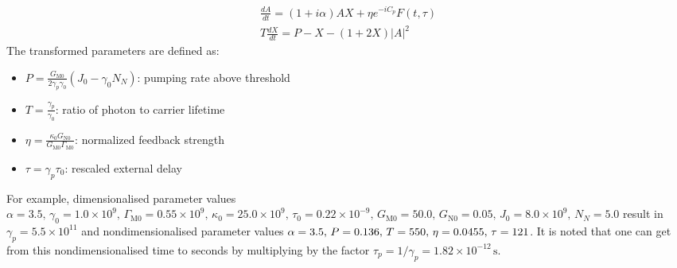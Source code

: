 %
\[
\begin{gathered}
\frac{d A}{d t} = (1 + i \alpha) A X + \eta e^{-i C_p} F(t,\tau) \\
T \frac{d X}{d t} = P - X - (1 + 2X)|A|^2
\end{gathered}
\]
%
The transformed parameters are defined as:
%
\begin{itemize}
  \item \( P = \frac{G_{\mathrm{M}0}}{2 \gamma_p \gamma_0}(J_0 - \gamma_0 N_N) \): pumping rate above threshold
  \item \( T = \frac{\gamma_p}{\gamma_0} \): ratio of photon to carrier lifetime
  \item \( \eta = \frac{\kappa_0 G_{\mathrm{N}0}}{G_{\mathrm{M}0} \Gamma_{\mathrm{M}0}} \): normalized feedback strength
  \item \( \tau = \gamma_p \tau_0 \): rescaled external delay
\end{itemize}
%
For example, dimensionalised parameter values $\alpha = 3.5, \, \gamma_0 = 1.0 \times 10^9, \, \Gamma_{\mathrm{M}0} = 0.55 \times 10^9,\,
\kappa_0 = 25.0 \times 10^9, \, \tau_0 = 0.22 \times 10^{-9}, \, G_{\mathrm{M}0} = 50.0, \, G_{\mathrm{N}0} = 0.05, \, J_0 = 8.0 \times 10^9, \,
N_N = 5.0$ result in $\gamma_p = 5.5 \times 10^{11}$ and nondimensionalised parameter values $\alpha = 3.5, \, P = 0.136, \, T = 550, \, \eta = 0.0455, \, \tau = 121$.
%
It is noted that one can get from this nondimensionalised time to seconds by multiplying by the factor $\tau_p = 1/\gamma_p = 1.82 \times 10^{-12}\,\text{s}$.
%
%
